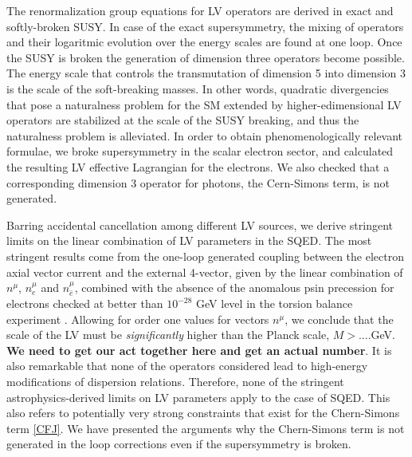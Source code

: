 \documentclass[12pt]{revtex4}
\begin{document}
The renormalization group equations for LV operators are derived 
in exact and softly-broken SUSY. In case of the exact supersymmetry, 
the mixing of operators and their logaritmic evolution over the energy scales are 
found at one loop. Once the SUSY is broken the generation of dimension 
three operators become possible. The energy scale that controls the transmutation 
of dimension 5 into dimension 3 is the scale of the soft-breaking masses. 
In other words, quadratic divergencies that pose a naturalness problem for the 
SM extended by higher-edimensional LV operators are stabilized at the scale of the 
SUSY breaking, and thus the naturalness problem is alleviated. 
In order to obtain phenomenologically relevant formulae, we broke supersymmetry in the
scalar electron sector, and calculated the resulting LV effective Lagrangian for the 
electrons. We also checked that a corresponding dimension 3 operator for photons, 
the Cern-Simons term, is not generated. 

Barring accidental cancellation among different LV sources, we derive 
stringent limits on the linear combination of LV parameters in the 
SQED. The most stringent results come from the one-loop generated 
coupling between the electron axial vector current and the external 
4-vector, given by the linear combination of $n^\mu$, $n^\mu_e$ and $n^{\mu}_{\bar e}$,
combined with the absence of the anomalous psin precession for 
electrons checked at better than $10^{-28}$ GeV level in the 
torsion balance experiment \cite{Heckel:1999sy}. Allowing for order one values for 
vectors $n^\mu$, we conclude that the scale of the LV must be {\em significantly}
higher than the Planck scale, $M> $....GeV. {\bf We need to get our act together here 
and get an actual number}. It is also remarkable that none of the 
operators considered lead to high-energy modifications of dispersion relations. 
Therefore, none of the stringent astrophysics-derived limits on LV parameters 
\cite{Ted1,GK} apply to the case of SQED. This also refers to potentially very strong 
 constraints that exist for the Chern-Simons term \ref{CFJ}. We have presented 
 the arguments why the Chern-Simons term is not generated in the loop corrections 
 even if the supersymmetry is broken. 
 
\end{document}
